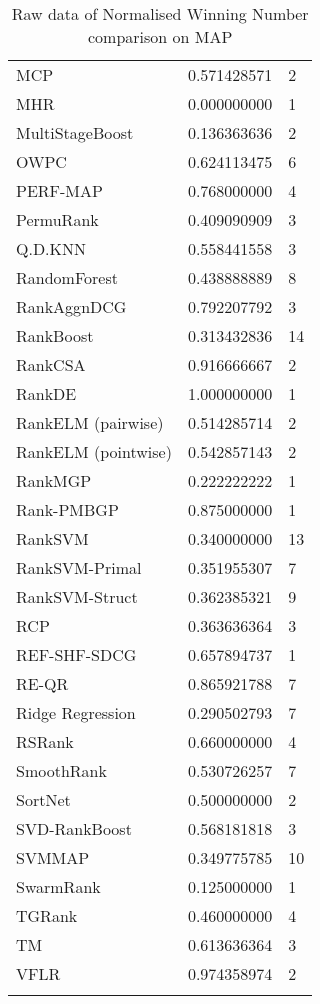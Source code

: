 \begin{longtable}{l|l|l}
MCP & 0.571428571 & 2 \\ 
MHR & 0.000000000 & 1 \\ 
MultiStageBoost & 0.136363636 & 2 \\ 
OWPC & 0.624113475 & 6 \\ 
PERF-\acs{MAP} & 0.768000000 & 4 \\ 
PermuRank & 0.409090909 & 3 \\ 
Q.D.\acs{KNN} & 0.558441558 & 3 \\ 
RandomForest & 0.438888889 & 8 \\ 
RankAgg\acs{nDCG} & 0.792207792 & 3 \\ 
RankBoost & 0.313432836 & 14 \\ 
RankCSA & 0.916666667 & 2 \\ 
RankDE & 1.000000000 & 1 \\ 
RankELM (pairwise) & 0.514285714 & 2 \\ 
RankELM (pointwise) & 0.542857143 & 2 \\ 
RankMGP & 0.222222222 & 1 \\ 
Rank-PMBGP & 0.875000000 & 1 \\ 
Rank\acs{SVM} & 0.340000000 & 13 \\ 
Rank\acs{SVM}-Primal & 0.351955307 & 7 \\ 
Rank\acs{SVM}-Struct & 0.362385321 & 9 \\ 
RCP & 0.363636364 & 3 \\ 
REF-SHF-SDCG & 0.657894737 & 1 \\ 
RE-QR & 0.865921788 & 7 \\ 
Ridge Regression & 0.290502793 & 7 \\ 
RSRank & 0.660000000 & 4 \\ 
SmoothRank & 0.530726257 & 7 \\ 
SortNet & 0.500000000 & 2 \\ 
\acs{SVD}-RankBoost & 0.568181818 & 3 \\ 
\acs{SVM}\acs{MAP} & 0.349775785 & 10 \\ 
SwarmRank & 0.125000000 & 1 \\ 
TGRank & 0.460000000 & 4 \\ 
TM & 0.613636364 & 3 \\ 
VFLR & 0.974358974 & 2 \\ 
\caption{Raw data of Normalised Winning Number comparison on \acs{MAP}}
\label{tab:raw_data_norm_winnum_map}
\end{longtable}